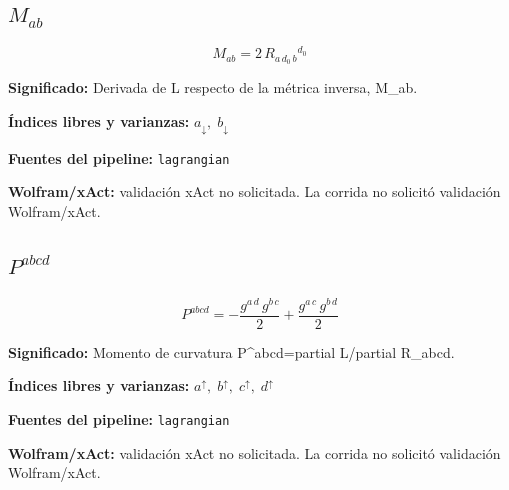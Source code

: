 \documentclass[11pt]{article}
\begin{document}
\subsection*{$ M_{ab} $}
\begin{dmath*}[breakdepth={5}]
M_{ab} = 2\,R{}_{a\,d_{0}\,b}{}^{d_{0}}
\end{dmath*}
\par\vspace{1.2\baselineskip}\noindent
\begin{minipage}{\linewidth}
\textbf{Significado:} Derivada de L respecto de la métrica inversa, M\_ab.\par
\textbf{Índices libres y varianzas:} $ a_{\downarrow},\;b_{\downarrow} $\par
\textbf{Fuentes del pipeline:} \texttt{lagrangian}\par
\textbf{Wolfram/xAct:} validación xAct no solicitada. La corrida no solicitó validación Wolfram/xAct.\par
\end{minipage}
\subsection*{$ P^{abcd} $}
\begin{dmath*}[breakdepth={5}]
P^{abcd} = -\frac{g{}^{a\,d}\,g{}^{b\,c}}{2} + \frac{g{}^{a\,c}\,g{}^{b\,d}}{2}
\end{dmath*}
\par\vspace{1.2\baselineskip}\noindent
\begin{minipage}{\linewidth}
\textbf{Significado:} Momento de curvatura P^{abcd}=partial L/partial R\_abcd.\par
\textbf{Índices libres y varianzas:} $ a^{\uparrow},\;b^{\uparrow},\;c^{\uparrow},\;d^{\uparrow} $\par
\textbf{Fuentes del pipeline:} \texttt{lagrangian}\par
\textbf{Wolfram/xAct:} validación xAct no solicitada. La corrida no solicitó validación Wolfram/xAct.\par
\end{minipage}
\end{document}
